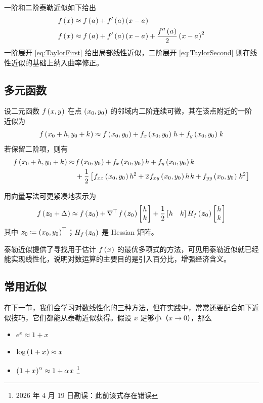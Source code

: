 一阶和二阶泰勒近似如下给出
\begin{align}
    f\left(\mspace{1mu} x\mspace{1mu}\right) &\approx f\left(\mspace{1mu} a\mspace{1mu}\right)+f'\left(\mspace{1mu} a\mspace{1mu}\right)\left(\mspace{1mu} x-a\mspace{1mu}\right)\label{eq:TaylorFirst}\\
    f\left(\mspace{1mu} x\mspace{1mu}\right) &\approx f\left(\mspace{1mu} a\mspace{1mu}\right)+f'\left(\mspace{1mu} a\mspace{1mu}\right)\left(\mspace{1mu} x-a\mspace{1mu}\right)+\frac{f''\left(\mspace{1mu} a\mspace{1mu}\right)}{2}\left(\mspace{1mu} x-a\mspace{1mu}\right)^{2}\label{eq:TaylorSecond}
\end{align}
一阶展开 \ref{eq:TaylorFirst} 给出局部线性近似，二阶展开 \ref{eq:TaylorSecond} 则在线性近似的基础上纳入曲率修正。

\subsection{多元函数}\label{subsec:TaylorMultiVar}

设二元函数 \(f\left(\mspace{1mu} x,y\mspace{1mu}\right)\) 在点 \(\left(\mspace{1mu} x_0,y_0\mspace{1mu}\right)\) 的邻域内二阶连续可微，其在该点附近的一阶近似为
\begin{equation}
    f\bka{x_0+h,y_0+k}\approx f\bka{x_0,y_0}+f_x\bka{x_0,y_0}\,h+f_y\bka{x_0,y_0}\,k\label{eq:MultiTaylor}
\end{equation}
若保留二阶项，则有
\begin{align}
    f\bka{x_0+h,y_0+k}\approx\,& f\bka{x_0,y_0}+f_x\bka{x_0,y_0}h+f_y\bka{x_0,y_0}k\notag\\
    &+\frac12\bks{f_{xx}\bka{x_0,y_0}h^2+2\,f_{xy}\bka{x_0,y_0}h\,k+f_{yy}\bka{x_0,y_0}\,k^2}
\end{align}

用向量写法可更紧凑地表示为
\begin{equation}
    f\bka{\bs z_0+\Delta}\approx f\bka{\bs z_0}+\nabla\tra \, f\bka{\bs z_0}\matbks{h\\k}+\frac12\bks{h\quad k} H_f\bka{\bs z_0}\matbks{h\\k}
\end{equation}
其中 \(\bm{z}_0\coloneq\left(\mspace{1mu} x_0,y_0\mspace{1mu}\right)^{\top}\)；\(H_f\left(\mspace{1mu}\bm{z}_0\mspace{1mu}\right)\) 是 Hessian 矩阵。

泰勒近似提供了寻找用于估计 \(f\left(\mspace{1mu} x\mspace{1mu}\right)\) 的最优多项式的方法，可见用泰勒近似就已经能实现线性化，说明对数运算的主要目的是引入百分比，增强经济含义。

\subsection{常用近似}\label{subsec:CommonApprox}

在下一节，我们会学习对数线性化的三种方法，但在实践中，常常还要配合如下近似技巧，它们都能从泰勒近似获得。假设 \(x\) 足够小（\(x\to0\)），那么
\begin{itemize}
    \item \(e^x\approx 1+x\)
    \item \(\operatorname{log}\left(\mspace{1mu}1+x\mspace{1mu}\right)\approx x\)
    \item \(\bka{1+x}^\alpha\approx 1+ \alpha\,x\) \footnote{2026 年 4 月 19 日勘误：此前该式存在错误}
\end{itemize}

